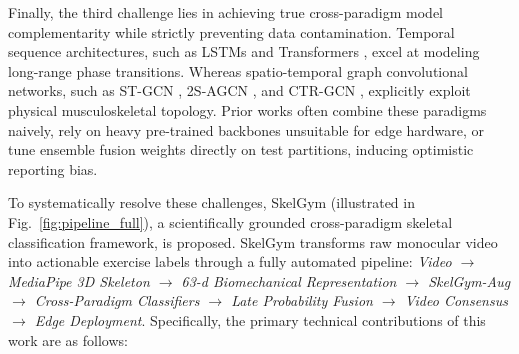 \documentclass[preprint,12pt]{elsarticle}
\begin{document}
Finally, the third challenge lies in achieving true cross-paradigm model complementarity while strictly preventing data contamination. Temporal sequence architectures, such as LSTMs \cite{hochreiter1997long,graves2005} and Transformers \cite{vaswani2017}, excel at modeling long-range phase transitions. Whereas spatio-temporal graph convolutional networks, such as ST-GCN \cite{yan2018}, 2S-AGCN \cite{shi2019two}, and CTR-GCN \cite{chen2021channel}, explicitly exploit physical musculoskeletal topology. Prior works often combine these paradigms naively, rely on heavy pre-trained backbones unsuitable for edge hardware, or tune ensemble fusion weights directly on test partitions, inducing optimistic reporting bias.

To systematically resolve these challenges, SkelGym (illustrated in Fig.~\ref{fig:pipeline_full}), a scientifically grounded cross-paradigm skeletal classification framework, is proposed. SkelGym transforms raw monocular video into actionable exercise labels through a fully automated pipeline: \textit{Video $\rightarrow$ MediaPipe 3D Skeleton $\rightarrow$ 63-d Biomechanical Representation $\rightarrow$ SkelGym-Aug $\rightarrow$ Cross-Paradigm Classifiers $\rightarrow$ Late Probability Fusion $\rightarrow$ Video Consensus $\rightarrow$ Edge Deployment}. Specifically, the primary technical contributions of this work are as follows:
\end{document}
